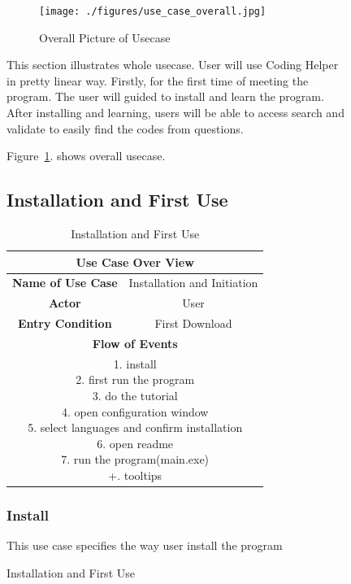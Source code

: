 \documentclass[conference]{IEEEtran}
\begin{document}
\begin{itemize}
\begin{itemize}
\begin{itemize}
\begin{itemize}
\begin{figure}[h]
\begin{enumerate}
\begin{itemize}
\begin{enumerate}
\begin{figure}[ht]
\centering
\texttt{[image: ./figures/use\_case\_overall.jpg]}
\caption{Overall Picture of Usecase}
\label{fig:usecase}
\end{figure}
This section illustrates whole usecase. User will use Coding Helper in pretty linear way. Firstly, for the first time of meeting the program.
The user will guided to install and learn the program.
After installing and learning, users will be able to access search and validate to easily find the codes from questions.

Figure~\ref{fig:usecase}. shows overall usecase.  

\subsection{Installation and First Use}
\begin{table}[ht]
\renewcommand{\arraystretch}{1}
\caption{Installation and First Use}
\label{table:usecase1}
\centering
\begin{adjustbox}{width=0.4 \textwidth}
\small
\begin{tabular}{c|c}
\hline
\multicolumn{2}{c}{\textbf{Use Case Over View}} \\
\hline
\textbf{Name of Use Case} & Installation and Initiation \\
\hline
\textbf{Actor} & User \\
\hline
\textbf{Entry Condition} & First Download\\
\hline
\multicolumn{2}{c}{\textbf{Flow of Events}}\\
\hline
\multicolumn{2}{c}{
\parbox[t]{5cm}{
  1. install \\
  2. first run the program \\
  3. do the tutorial \\
  4. open configuration window \\
  5. select languages and confirm installation \\
  6. open readme \\
  7. run the program(main.exe) \\
  +. tooltips
  }
}\\
\hline

\end{tabular}
\end{adjustbox}
\end{table}
%

\subsubsection{Install}
This use case specifies the way user install the program


\end{enumerate}
\end{itemize}
\end{enumerate}
\end{figure}
\end{itemize}
\end{itemize}
\end{itemize}
\end{itemize}
\end{document}
